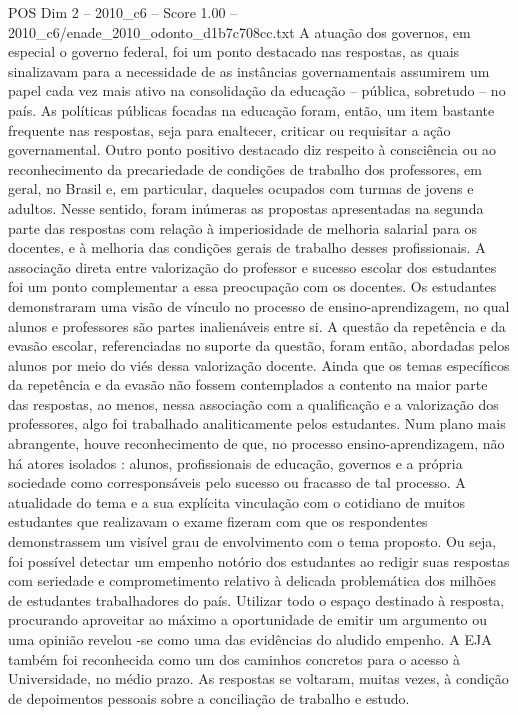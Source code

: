 \begin{textsample}{POS Dim 2 – 2010\_c6 – Score 1.00 – 2010\_c6/enade\_2010\_odonto\_d1b7c708cc.txt}
A atuação dos governos, em especial o governo federal, foi um ponto destacado nas respostas, as quais sinalizavam para a necessidade de as instâncias governamentais assumirem um papel cada vez mais ativo na consolidação da educação – pública, sobretudo – no país.
As políticas públicas focadas na educação foram, então, um item bastante frequente nas respostas, seja para enaltecer, criticar ou requisitar a ação governamental.
Outro ponto positivo destacado diz respeito à consciência ou ao reconhecimento da precariedade de condições de trabalho dos professores, em geral, no Brasil e, em particular, daqueles ocupados com turmas de jovens e adultos.
Nesse sentido, foram inúmeras as propostas apresentadas na segunda parte das respostas com relação à imperiosidade de melhoria salarial para os docentes, e à melhoria das condições gerais de trabalho desses profissionais.
A associação direta entre valorização do professor e sucesso escolar dos estudantes foi um ponto complementar a essa preocupação com os docentes.
Os estudantes demonstraram uma visão de vínculo no processo de ensino-aprendizagem, no qual alunos e professores são partes inalienáveis entre si.
A questão da repetência e da evasão escolar, referenciadas no suporte da questão, foram então, abordadas pelos alunos por meio do viés dessa valorização docente.
Ainda que os temas específicos da repetência e da evasão não fossem contemplados a contento na maior parte das respostas, ao menos, nessa associação com a qualificação e a valorização dos professores, algo foi trabalhado analiticamente pelos estudantes.
Num plano mais abrangente, houve reconhecimento de que, no processo ensino-aprendizagem, não há atores isolados : alunos, profissionais de educação, governos e a própria sociedade como corresponsáveis pelo sucesso ou fracasso de tal processo.
A atualidade do tema e a sua explícita vinculação com o cotidiano de muitos estudantes que realizavam o exame fizeram com que os respondentes demonstrassem um visível grau de envolvimento com o tema proposto.
Ou seja, foi possível detectar um empenho notório dos estudantes ao redigir suas respostas com seriedade e comprometimento relativo à delicada problemática dos milhões de estudantes trabalhadores do país.
Utilizar todo o espaço destinado à resposta, procurando aproveitar ao máximo a oportunidade de emitir um argumento ou uma opinião revelou -se como uma das evidências do aludido empenho.
A EJA também foi reconhecida como um dos caminhos concretos para o acesso à Universidade, no médio prazo.
As respostas se voltaram, muitas vezes, à condição de depoimentos pessoais sobre a conciliação de trabalho e estudo.

\end{textsample}
